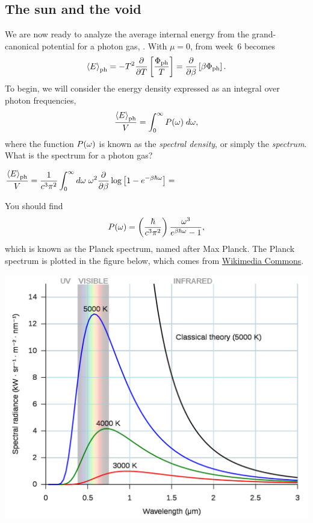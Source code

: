 \subsection{The sun and the void}
We are now ready to analyze the average internal energy from the grand-canonical potential for a photon gas, .
With $\mu = 0$,  from week~6 becomes
\begin{equation*}
  \left\langle E \right\rangle_{\text{ph}} = -T^2 \frac{\partial }{\partial T} \left[\frac{\Phi_{\text{ph}}}{T}\right] = \frac{\partial }{\partial \beta} \left[\beta \Phi_{\text{ph}}\right].
\end{equation*}
To begin, we will consider the energy density expressed as an integral over photon frequencies,
\begin{equation*}
  \frac{\left\langle E \right\rangle_{\text{ph}}}{V} = \int_0^{\infty} P(\omega) \; d\omega,
\end{equation*}
where the function $P(\omega)$ is known as the \textit{spectral density}, or simply the \textit{spectrum}.
What is the spectrum for a photon gas?
\begin{mdframed}
  $\displaystyle \frac{\left\langle E \right\rangle_{\text{ph}}}{V} = \frac{1}{c^3 \pi^2} \int_0^{\infty} d\omega \; \omega^2 \frac{\partial }{\partial \beta} \log\left[1 - e^{-\beta \hbar \omega}\right] = $ \\[100 pt]
\end{mdframed}

You should find
\begin{equation}
  \label{eq:Planck_omega}
  P(\omega) = \left(\frac{\hbar}{c^3 \pi^2}\right) \frac{\omega^3}{e^{\beta \hbar \omega} - 1},
\end{equation}
which is known as the Planck spectrum, named after Max Planck.
The Planck spectrum is plotted in the figure below, which comes from \href{https://commons.wikimedia.org/wiki/File:Black_body.svg}{Wikimedia Commons}.

\begin{center}\includegraphics[width=\textwidth]{figs/week08_spectrum.pdf}\end{center}

